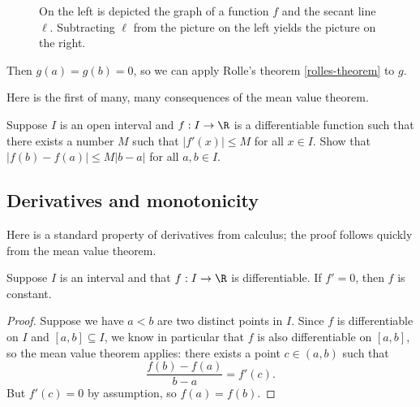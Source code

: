 \begin{exercise}
\begin{hint}
\begin{figure}
\begin{center}
		\end{center}
		\caption{On the left is depicted the graph of a function $f$ and the secant line $\ell$. Subtracting $\ell$ from the picture on the left yields the picture on the right. }  \label{subtracting-the-secant}
	\end{figure}
	Then $g(a) = g(b) = 0$, so we can apply Rolle's theorem \ref{rolles-theorem} to $g$.
	\end{hint} 
\end{exercise}

Here is the first of many, many consequences of the mean value theorem. 

\begin{exercise} \label{bounded-derivative}
	Suppose $I$ is an open interval and $f : I \to \R$ is a differentiable function such that there exists a number $M$ such that $|f'(x)| \leq M$ for all $x \in I$. Show that $|f(b) - f(a)| \leq M|b-a|$ for all $a, b \in I$. 
\end{exercise}

\subsection{Derivatives and monotonicity}

Here is a standard property of derivatives from calculus; the proof follows quickly from the mean value theorem. 

\begin{proposition} \label{deriv-zero-implies-constant}
	Suppose $I$ is an interval and that $f : I \to \R$ is differentiable. If $f' = 0$, then $f$ is constant. 
\end{proposition}

\begin{proof}
	Suppose we have $a < b$ are two distinct points in $I$. Since $f$ is differentiable on $I$ and $[a,b] \subseteq I$, we know in particular that $f$ is also differentiable on $[a,b]$, so the mean value theorem applies: there exists a point $c \in (a,b)$ such that
	\[ \frac{f(b)-f(a)}{b-a} = f'(c). \]
	But $f'(c) = 0$ by assumption, so $f(a) = f(b)$. 
\end{proof}

